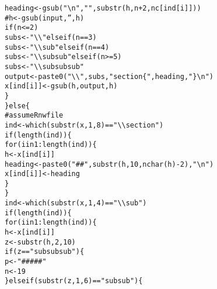 \documentclass{article}\usepackage[]{graphicx}\usepackage[]{color}
\makeatletter
\newcommand{\hlnum}[1]{\textcolor[rgb]{0.863,0.196,0.184}{#1}}%
\newcommand{\hlstr}[1]{\textcolor[rgb]{0.863,0.196,0.184}{#1}}%
\newcommand{\hlcom}[1]{\textcolor[rgb]{0.345,0.431,0.459}{#1}}%
\newcommand{\hlopt}[1]{\textcolor[rgb]{0.576,0.631,0.631}{#1}}%
\newcommand{\hlstd}[1]{\textcolor[rgb]{0.514,0.58,0.588}{#1}}%
\newcommand{\hlkwa}[1]{\textcolor[rgb]{0.796,0.294,0.086}{#1}}%
\newcommand{\hlkwb}[1]{\textcolor[rgb]{0.522,0.6,0}{#1}}%
\newcommand{\hlkwd}[1]{\textcolor[rgb]{0.576,0.631,0.631}{#1}}%
\newenvironment{kframe}{%
 \def\at@end@of@kframe{}%
 \ifinner\ifhmode%
  \def\at@end@of@kframe{\end{minipage}}%
  \begin{minipage}{\columnwidth}%
 \fi\fi%
 \def\FrameCommand##1{\hskip\@totalleftmargin \hskip-\fboxsep
 \colorbox{shadecolor}{##1}\hskip-\fboxsep
     \hskip-\linewidth \hskip-\@totalleftmargin \hskip\columnwidth}%
 \MakeFramed {\advance\hsize-\width
   \@totalleftmargin\z@ \linewidth\hsize
   \@setminipage}}%
 {\par\unskip\endMakeFramed%
 \at@end@of@kframe}
\newenvironment{knitrout}{}{} %
\makeatother
\begin{document}
\begin{knitrout}
\begin{kframe}
\begin{alltt}
            \hlstd{heading} \hlkwb{<-} \hlkwd{gsub}\hlstd{(}\hlstr{"\textbackslash{}n"}\hlstd{,} \hlstr{""}\hlstd{,} \hlkwd{substr}\hlstd{(h, n} \hlopt{+} \hlnum{2}\hlstd{, nc[ind[i]]))}
            \hlcom{# h <- gsub(input, '', h)}
            \hlkwa{if} \hlstd{(n} \hlopt{<=} \hlnum{2}\hlstd{)}
                \hlstd{subs} \hlkwb{<-} \hlstr{"\textbackslash{}\textbackslash{}"} \hlkwa{else if} \hlstd{(n} \hlopt{==} \hlnum{3}\hlstd{)}
                \hlstd{subs} \hlkwb{<-} \hlstr{"\textbackslash{}\textbackslash{}sub"} \hlkwa{else if} \hlstd{(n} \hlopt{==} \hlnum{4}\hlstd{)}
                \hlstd{subs} \hlkwb{<-} \hlstr{"\textbackslash{}\textbackslash{}subsub"} \hlkwa{else if} \hlstd{(n} \hlopt{>=} \hlnum{5}\hlstd{)}
                \hlstd{subs} \hlkwb{<-} \hlstr{"\textbackslash{}\textbackslash{}subsubsub"}
            \hlstd{output} \hlkwb{<-} \hlkwd{paste0}\hlstd{(}\hlstr{"\textbackslash{}\textbackslash{}"}\hlstd{, subs,} \hlstr{"section\{"}\hlstd{, heading,} \hlstr{"\}\textbackslash{}n"}\hlstd{)}
            \hlstd{x[ind[i]]} \hlkwb{<-} \hlkwd{gsub}\hlstd{(h, output, h)}
        \hlstd{\}}
    \hlstd{\}} \hlkwa{else} \hlstd{\{}
        \hlcom{# assume Rnw file}
        \hlstd{ind} \hlkwb{<-} \hlkwd{which}\hlstd{(}\hlkwd{substr}\hlstd{(x,} \hlnum{1}\hlstd{,} \hlnum{8}\hlstd{)} \hlopt{==} \hlstr{"\textbackslash{}\textbackslash{}section"}\hlstd{)}
        \hlkwa{if} \hlstd{(}\hlkwd{length}\hlstd{(ind)) \{}
            \hlkwa{for} \hlstd{(i} \hlkwa{in} \hlnum{1}\hlopt{:}\hlkwd{length}\hlstd{(ind)) \{}
                \hlstd{h} \hlkwb{<-} \hlstd{x[ind[i]]}
                \hlstd{heading} \hlkwb{<-} \hlkwd{paste0}\hlstd{(}\hlstr{"## "}\hlstd{,} \hlkwd{substr}\hlstd{(h,} \hlnum{10}\hlstd{,} \hlkwd{nchar}\hlstd{(h)} \hlopt{-} \hlnum{2}\hlstd{),} \hlstr{"\textbackslash{}n"}\hlstd{)}
                \hlstd{x[ind[i]]} \hlkwb{<-} \hlstd{heading}
            \hlstd{\}}
        \hlstd{\}}
        \hlstd{ind} \hlkwb{<-} \hlkwd{which}\hlstd{(}\hlkwd{substr}\hlstd{(x,} \hlnum{1}\hlstd{,} \hlnum{4}\hlstd{)} \hlopt{==} \hlstr{"\textbackslash{}\textbackslash{}sub"}\hlstd{)}
        \hlkwa{if} \hlstd{(}\hlkwd{length}\hlstd{(ind)) \{}
            \hlkwa{for} \hlstd{(i} \hlkwa{in} \hlnum{1}\hlopt{:}\hlkwd{length}\hlstd{(ind)) \{}
                \hlstd{h} \hlkwb{<-} \hlstd{x[ind[i]]}
                \hlstd{z} \hlkwb{<-} \hlkwd{substr}\hlstd{(h,} \hlnum{2}\hlstd{,} \hlnum{10}\hlstd{)}
                \hlkwa{if} \hlstd{(z} \hlopt{==} \hlstr{"subsubsub"}\hlstd{) \{}
                  \hlstd{p} \hlkwb{<-} \hlstr{"##### "}
                  \hlstd{n} \hlkwb{<-} \hlnum{19}
                \hlstd{\}} \hlkwa{else if} \hlstd{(}\hlkwd{substr}\hlstd{(z,} \hlnum{1}\hlstd{,} \hlnum{6}\hlstd{)} \hlopt{==} \hlstr{"subsub"}\hlstd{) \{}

\end{alltt}
\end{kframe}
\end{knitrout}
\end{document}
